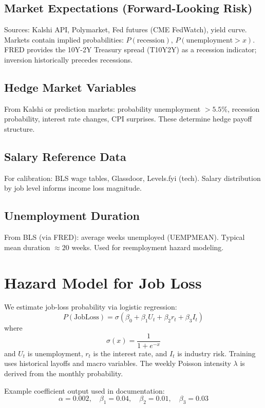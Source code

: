 \documentclass[11pt]{article}
\begin{document}
\subsection{Market Expectations (Forward-Looking Risk)}

Sources: Kalshi API, Polymarket, Fed futures (CME FedWatch), yield curve.
Markets contain implied probabilities: $P(\text{recession})$, 
$P(\text{unemployment} > x)$. FRED provides the 10Y-2Y Treasury spread 
(T10Y2Y) as a recession indicator; inversion historically precedes recessions.

\subsection{Hedge Market Variables}

From Kalshi or prediction markets: probability unemployment $> 5.5\%$, 
recession probability, interest rate changes, CPI surprises. These determine 
hedge payoff structure.

\subsection{Salary Reference Data}

For calibration: BLS wage tables, Glassdoor, Levels.fyi (tech). 
Salary distribution by job level informs income loss magnitude.

\subsection{Unemployment Duration}

From BLS (via FRED): average weeks unemployed (UEMPMEAN). 
Typical mean duration $\approx 20$ weeks. Used for reemployment hazard modeling.

\section{Hazard Model for Job Loss}

We estimate job-loss probability via logistic regression:
\[
P(\text{JobLoss}) = \sigma\left(\beta_0 + \beta_1 U_t + \beta_2 r_t + \beta_3 I_t\right)
\]
where
\[
\sigma(x) = \frac{1}{1+e^{-x}}
\]
and $U_t$ is unemployment, $r_t$ is the interest rate, and $I_t$ is industry risk.
Training uses historical layoffs and macro variables. The weekly Poisson intensity $\lambda$ 
is derived from the monthly probability.

Example coefficient output used in documentation:
\[
\alpha = 0.002,\quad \beta_1 = 0.04,\quad \beta_2 = 0.01,\quad \beta_3 = 0.03
\]
\end{document}
